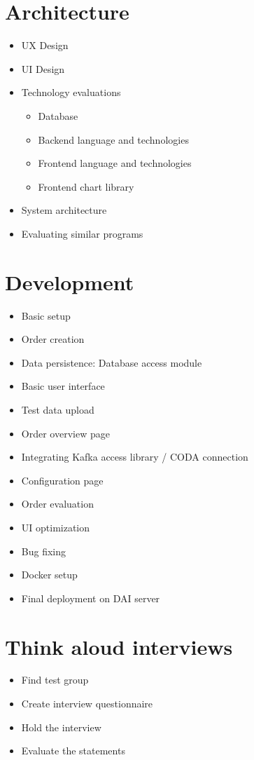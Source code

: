 \documentclass[12pt,a4paper,titlepage,oneside,BCOR1cm]{scrreprt}
\begin{document}
\section{Architecture}
\begin{itemize}
  \item UX Design
  \item UI Design
  \item Technology evaluations
  
  \begin{itemize}
    \item Database
    \item Backend language and technologies
    \item Frontend language and technologies
    \item Frontend chart library
  \end{itemize}  
  \item System architecture
  \item Evaluating similar programs

\end{itemize}  

\section{Development}
\begin{itemize}
  \item Basic setup
  \item Order creation
  \item Data persistence: Database access module
  \item Basic user interface
  \item Test data upload
  \item Order overview page
  \item Integrating Kafka access library / CODA connection
  \item Configuration page
  \item Order evaluation
  \item UI optimization  
  \item Bug fixing
  \item Docker setup
  \item Final deployment on DAI server
\end{itemize}
\section{Think aloud interviews}
  \begin{itemize}
    \item Find test group
    \item Create interview questionnaire
    \item Hold the interview
    \item Evaluate the statements
  \end{itemize}
\end{document}
